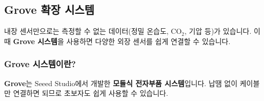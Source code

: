 \documentclass[11pt, a4paper]{article}
\begin{document}
\subsection{Grove 확장 시스템}

내장 센서만으로는 측정할 수 없는 데이터(정밀 온습도, CO$_2$, 기압 등)가 있습니다. 이때 \textbf{Grove 시스템}을 사용하면 다양한 외장 센서를 쉽게 연결할 수 있습니다.

\subsubsection{Grove 시스템이란?}

\textbf{Grove}는 Seeed Studio에서 개발한 \textbf{모듈식 전자부품 시스템}입니다. 납땜 없이 케이블만 연결하면 되므로 초보자도 쉽게 사용할 수 있습니다.

\end{document}
